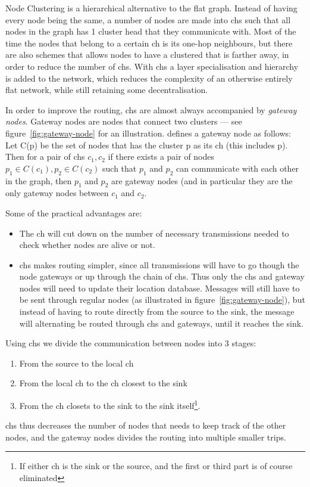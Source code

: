 \label{cluster methods}
Node Clustering is a hierarchical alternative to the flat graph. Instead of having every node being the same, a number of nodes are made into \acp{ch} such that all nodes in the graph has 1 cluster head that they communicate with. Most of the time the nodes that belong to a certain \ac{ch} is its one-hop neighbours, but there are also schemes that allows nodes to have a clustered that is farther away, in order to reduce the number of \acp{ch}. With \acp{ch} a layer specialisation and hierarchy is added to the network, which reduces the complexity of an otherwise entirely flat network, while still retaining some decentralisation.

In order to improve the routing, \acp{ch} are almost always accompanied by \emph{gateway nodes}. Gateway nodes are nodes that connect two clusters --- see figure~\ref{fig:gateway-node} for an illustration. \cite{spanners} defines a gateway node as follows:
Let C(p) be the set of nodes that has the cluster p as its \ac{ch} (this includes p). Then for a pair of \acp{ch} $c_1, c_2$ if there exists a pair of nodes $p_1 \in C(c_1), p_2 \in C(c_2)$ such that $p_1$ and $p_2$ can communicate with each other in the graph, then $p_1$ and $p_2$ are gateway nodes (and in particular they are the only gateway nodes between $c_1$ and $c_2$.  

Some of the practical advantages are:
\begin{itemize}
\item The \ac{ch} will cut down on the number of necessary transmissions needed to check whether nodes are alive or not.
\item \acp{ch} makes routing simpler, since all transmissions will have to go though the node gateways or up through the chain of \acp{ch}. Thus only the \acp{ch} and gateway nodes will need to update their location database. Messages will still have to be sent through regular nodes (as illustrated in figure~\ref{fig:gateway-node}), but instead of having to route directly from the source to the sink, the message will alternating be routed through \acp{ch} and gateways, until it reaches the sink.
\end{itemize}

Using \acp{ch} we divide the communication between nodes into 3 stages:
\begin{enumerate}
\item From the source to the local \ac{ch} 
\item From the local \ac{ch} to the \ac{ch} closest to the sink
\item From the \ac{ch} closets to the sink to the sink itself\footnote{If either \ac{ch} is the sink or the source, and the first or third part is of course eliminated}.
\end{enumerate}
 \acp{ch} thus decreases the number of nodes that needs to keep track of the other nodes, and the gateway nodes divides the routing into multiple smaller trips.  

